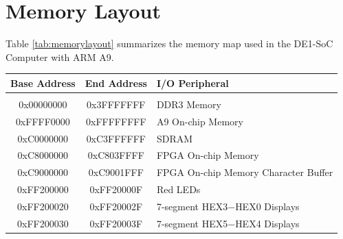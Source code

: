 \documentclass[11pt, twoside, pdftex]{article}
\newcommand{\commonFiles}{../../../common/doc}
\newcommand{\systemNameFull}{DE1-SoC Computer with ARM A9}
\begin{document}


\clearpage
\section{Memory Layout}
\label{sec:mm}

\noindent
Table \ref{tab:memorylayout} summarizes the memory map used in the \systemNameFull.
~\\

\begin{table}[h]
    \begin{center}
    \begin{tabular}{c|c|l}
            \textbf{Base Address}
            & \textbf{End Address}
            & \textbf{I/O Peripheral}
				\\\hline\vspace{-3mm}\\
            0x00000000
            & 0x3FFFFFFF
            & DDR3 Memory
        \\
            0xFFFF0000
            & 0xFFFFFFFF
            & A9 On-chip Memory
        \\
            0xC0000000
            & 0xC3FFFFFF
            & SDRAM
        \\
            0xC8000000
            & 0xC803FFFF
            & FPGA On-chip Memory
        \\
            0xC9000000
            & 0xC9001FFF
            & FPGA On-chip Memory Character Buffer
        \\
            0xFF200000
            & 0xFF20000F
            & Red LEDs
        \\
            0xFF200020
            & 0xFF20002F
            & 7-segment HEX3$-$HEX0 Displays
        \\
            0xFF200030
            & 0xFF20003F
            & 7-segment HEX5$-$HEX4 Displays


\end{tabular}
\end{center}
\end{table}
\end{document}
